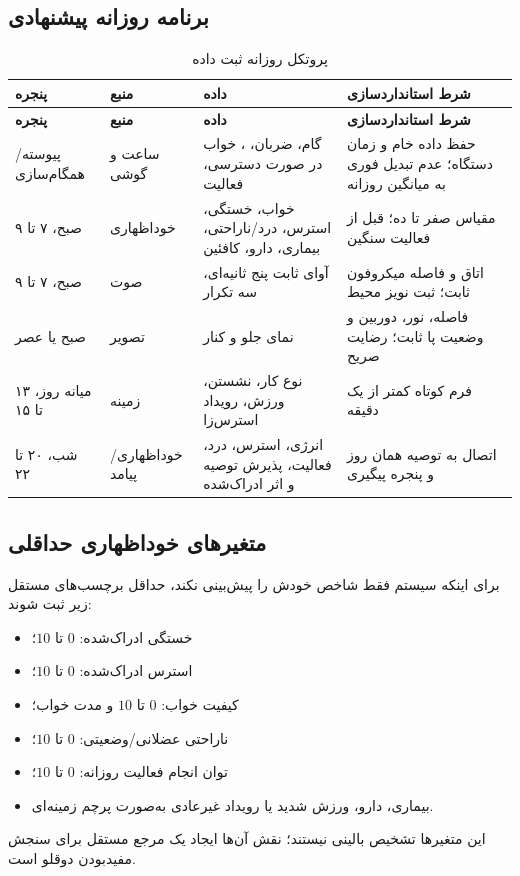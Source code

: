 \documentclass[11pt,a4paper]{article}
\newcommand{\en}[1]{\lr{#1}}
\begin{document}
\subsection{برنامه روزانه پیشنهادی}
\begin{longtable}{p{}p{}p{}p{}}
\caption{پروتکل روزانه ثبت داده}\label{tab:dailyprotocol}\\
\toprule
\textbf{پنجره} & \textbf{منبع} & \textbf{داده} & \textbf{شرط استانداردسازی}\\
\midrule
\endfirsthead
\toprule
\textbf{پنجره} & \textbf{منبع} & \textbf{داده} & \textbf{شرط استانداردسازی}\\
\midrule
\endhead
پیوسته/همگام‌سازی & ساعت و گوشی & گام، ضربان، \en{SpO2}، خواب در صورت دسترسی، فعالیت & حفظ داده خام و زمان دستگاه؛ عدم تبدیل فوری به میانگین روزانه\\
صبح، ۷ تا ۹ & خوداظهاری & خواب، خستگی، استرس، درد/ناراحتی، بیماری، دارو، کافئین & مقیاس صفر تا ده؛ قبل از فعالیت سنگین\\
صبح، ۷ تا ۹ & صوت & آوای ثابت پنج ثانیه‌ای، سه تکرار & اتاق و فاصله میکروفون ثابت؛ ثبت نویز محیط\\
صبح یا عصر & تصویر & نمای جلو و کنار & فاصله، نور، دوربین و وضعیت پا ثابت؛ رضایت صریح\\
میانه روز، ۱۳ تا ۱۵ & زمینه & نوع کار، نشستن، ورزش، رویداد استرس‌زا & فرم کوتاه کمتر از یک دقیقه\\
شب، ۲۰ تا ۲۲ & خوداظهاری/پیامد & انرژی، استرس، درد، فعالیت، پذیرش توصیه و اثر ادراک‌شده & اتصال به توصیه همان روز و پنجره پیگیری\\
\bottomrule
\end{longtable}

\subsection{متغیرهای خوداظهاری حداقلی}
برای اینکه سیستم فقط شاخص خودش را پیش‌بینی نکند، حداقل برچسب‌های مستقل زیر ثبت شوند:
\begin{itemize}
  \item خستگی ادراک‌شده: $0$ تا $10$؛
  \item استرس ادراک‌شده: $0$ تا $10$؛
  \item کیفیت خواب: $0$ تا $10$ و مدت خواب؛
  \item ناراحتی عضلانی/وضعیتی: $0$ تا $10$؛
  \item توان انجام فعالیت روزانه: $0$ تا $10$؛
  \item بیماری، دارو، ورزش شدید یا رویداد غیرعادی به‌صورت پرچم زمینه‌ای.
\end{itemize}
این متغیرها تشخیص بالینی نیستند؛ نقش آن‌ها ایجاد یک مرجع مستقل برای سنجش مفیدبودن دوقلو است.
\end{document}
